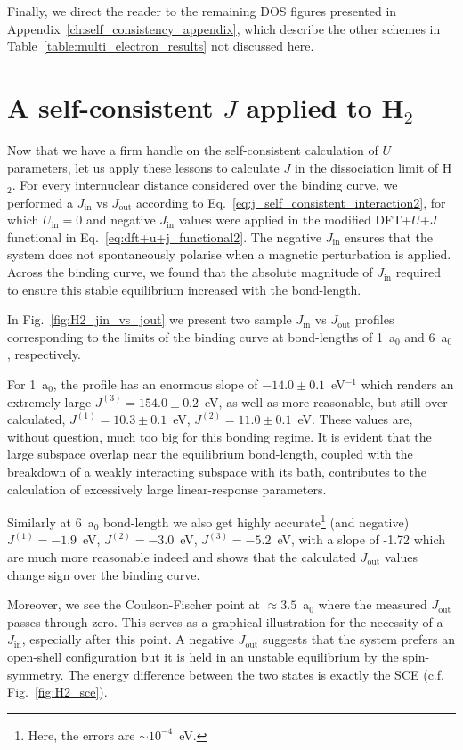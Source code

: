 Finally, we direct the reader to the remaining DOS figures 
presented in Appendix~\ref{ch:self_consistency_appendix}, 
which describe the other schemes in Table~\ref{table:multi_electron_results} 
not discussed here.
% 




\section{A self-consistent $J$ applied to H$_2$}

Now that we have a firm handle 
on the self-consistent calculation of $U$ parameters, 
let us apply these lessons to calculate  
$J$ in the dissociation limit of H$_2$.
%
For every internuclear distance considered over the binding curve, 
we performed a $J_\textrm{in}$ vs $J_\textrm{out}$ 
according to Eq.~\eqref{eq:j_self_consistent_interaction2}, 
for which $U_\textrm{in}=0$ and negative $J_\textrm{in}$ 
values were applied in the modified DFT+$U$+$J$ functional 
in Eq.~\eqref{eq:dft+u+j_functional2}.
%
{
The negative  $J_\textrm{in}$ ensures 
that the system does not spontaneously polarise 
when a magnetic perturbation is applied.}
%
Across the binding curve, 
we found that the absolute magnitude of $J_\textrm{in}$ 
required to ensure this stable equilibrium 
increased with the bond-length.
% 

In Fig.~\ref{fig:H2_jin_vs_jout} 
we present two sample 
$J_\textrm{in}$ vs $J_\textrm{out}$ profiles 
corresponding to the limits of the binding curve 
at bond-lengths of 1~a$_0$ and 6~a$_0$, respectively.
%
{
For 1~a$_0$, 
the profile has an enormous 
slope of $-14.0\pm0.1$~eV$^{-1}$ 
which renders an extremely large 
$J^{(3)}=154.0\pm0.2$~eV, 
as well as more reasonable, 
but still over calculated, 
$J^{(1)}=10.3\pm0.1$~eV, 
$J^{(2)}=11.0\pm0.1$~eV.
%
These values are, without question, 
much too big for this bonding regime.
%
It is evident that 
the large subspace overlap near the equilibrium bond-length, 
coupled with the breakdown of a weakly interacting 
subspace with its bath, 
contributes to the calculation of 
excessively large linear-response parameters.

Similarly at 6~a$_0$ bond-length we also get 
highly accurate\footnote{Here, the errors are $\sim10^{-4}$~eV.} 
(and negative) 
$J^{(1)}=-1.9$~eV, 
$J^{(2)}=-3.0$~eV, 
$J^{(3)}=-5.2$~eV, 
with a slope of -1.72
which are much more reasonable indeed 
and shows that the calculated $J_\textrm{out}$ values 
change sign over the binding curve.}
%
{Moreover, 
we see the Coulson-Fischer point at $\approx3.5$~a$_0$ 
where the measured $J_\textrm{out}$ passes through zero.
%
This serves as a graphical illustration for the 
necessity of a $J_\textrm{in}$, 
especially after this point.
% 
A negative $J_\textrm{out}$ suggests that the 
system prefers an open-shell configuration 
but it is held in an unstable equilibrium by the spin-symmetry.
%
The energy difference between the two states 
is exactly the SCE (c.f. Fig.~\ref{fig:H2_sce}).}

